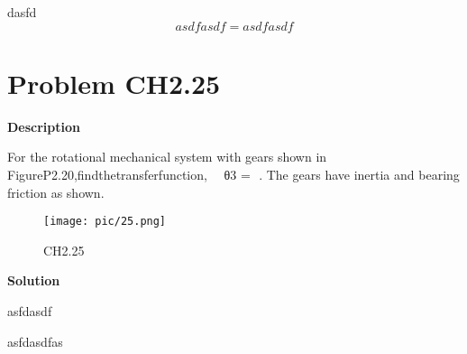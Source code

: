 dasfd
$$ asdfasdf = asdfasdf$$

\section{Problem CH2.25}
{\par\noindent \bf\large  Description   \par}
 For the rotational mechanical system with gears shown in FigureP2.20,findthetransferfunction,    θ3 =  . The gears have inertia and bearing friction as shown.
\begin{figure}[H]
\centering
\texttt{[image: pic/25.png]}
\caption{CH2.25} 
\end{figure}

{\par\noindent\bf\large Solution \par}
asfdasdf

asfdasdfas